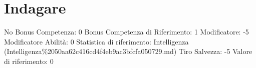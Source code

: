 \section{Indagare}\label{indagare}

\begin{description}
\tightlist
\item[Tags: ABI]
No Bonus Competenza: 0 Bonus Competenza di Riferimento: 1 Modificatore:
-5 Modificatore Abilità: 0 Statistica di riferimento: Intelligenza
(Intelligenza\%2050aa62c416cd4f4eb9ac3bfcfa050729.md) Tiro Salvezza: -5
Valore di riferimento: 0
\end{description}
